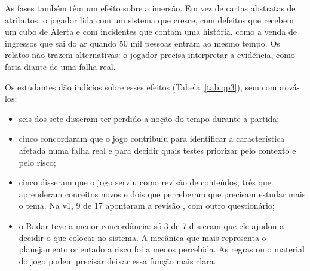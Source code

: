 

As fases também têm um efeito sobre a imersão. Em vez de cartas abstratas de atributos, o jogador lida com um
sistema que cresce, com defeitos que recebem um cubo de Alerta e com incidentes que contam uma história, como a
venda de ingressos que sai do ar quando 50 mil pessoas entram ao mesmo tempo. Os relatos não trazem alternativas:
o jogador precisa interpretar a evidência, como faria diante de uma falha real.

Os estudantes dão indícios sobre esses efeitos (Tabela~\ref{tab:qp3}), sem comprová-los:
\begin{itemize}
  \item seis dos sete disseram ter perdido a noção do tempo durante a partida;
  \item cinco concordaram que o jogo contribuiu para identificar a característica afetada numa falha real e para
    decidir quais testes priorizar pelo contexto e pelo risco;
  \item cinco disseram que o jogo serviu como revisão de conteúdos, três que aprenderam conceitos novos e dois que
    perceberam que precisam estudar mais o tema. Na v1, 9 de 17 apontaram a revisão \cite{oliveira2025critical},
    com outro questionário;
  \item o Radar teve a menor concordância: só 3 de 7 disseram que ele ajudou a decidir o que colocar no sistema.
    A mecânica que mais representa o planejamento orientado a risco foi a menos percebida. As regras ou o material
    do jogo podem precisar deixar essa função mais clara.
\end{itemize}

